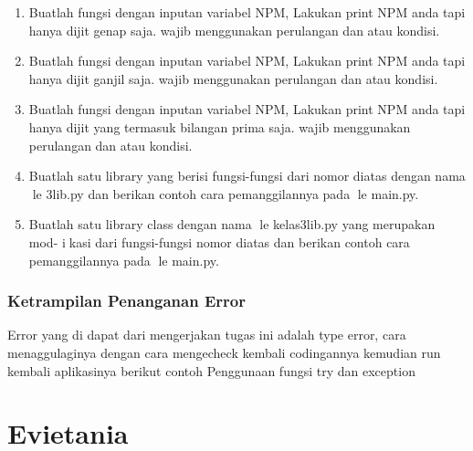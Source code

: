 \begin{enumerate}
    \item Buatlah fungsi dengan inputan variabel NPM, Lakukan print NPM anda tapi
    hanya dijit genap saja. wajib menggunakan perulangan dan atau kondisi.
    

    \item Buatlah fungsi dengan inputan variabel NPM, Lakukan print NPM anda tapi
    hanya dijit ganjil saja. wajib menggunakan perulangan dan atau kondisi.
    

    \item Buatlah fungsi dengan inputan variabel NPM, Lakukan print NPM anda tapi
    hanya dijit yang termasuk bilangan prima saja. wajib menggunakan perulangan
    dan atau kondisi.
    

    \item Buatlah satu library yang berisi fungsi-fungsi dari nomor diatas dengan nama
    le 3lib.py dan berikan contoh cara pemanggilannya pada le main.py.
    

    \item Buatlah satu library class dengan nama le kelas3lib.py yang merupakan mod-
    ikasi dari fungsi-fungsi nomor diatas dan berikan contoh cara pemanggilannya
    pada le main.py.
    

\end{enumerate}
\subsubsection{Ketrampilan Penanganan Error}
Error yang di dapat dari mengerjakan tugas ini adalah type error, cara menaggulaginya dengan cara mengecheck kembali codingannya
kemudian run kembali aplikasinya
berikut contoh Penggunaan fungsi try dan exception

\section{Evietania}
